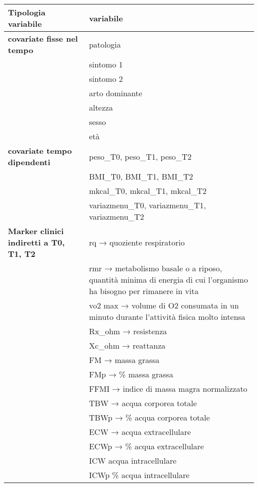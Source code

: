 \documentclass[
]{article}
\begin{document}
\begin{longtable}[]{@{}
  >{\raggedright\arraybackslash}p{}
  >{\raggedright\arraybackslash}p{}@{}}
\toprule\noalign{}
\begin{minipage}[b]{\linewidth}\raggedright
Tipologia variabile
\end{minipage} & \begin{minipage}[b]{\linewidth}\raggedright
variabile
\end{minipage} \\
\midrule\noalign{}
\endhead
\bottomrule\noalign{}
\endlastfoot
\textbf{covariate fisse nel tempo} & patologia \\
~ & sintomo 1 \\
~ & sintomo 2 \\
~ & arto dominante \\
~ & altezza \\
~ & sesso \\
~ & età \\
\textbf{covariate tempo dipendenti} & peso\_T0, peso\_T1, peso\_T2 \\
~ & BMI\_T0, BMI\_T1, BMI\_T2 \\
~ & mkcal\_T0, mkcal\_T1, mkcal\_T2 \\
~ & variazmenu\_T0, variazmenu\_T1, variazmenu\_T2 \\
\textbf{Marker clinici indiretti a T0, T1, T2} & rq → quoziente
respiratorio \\
~ & rmr → metabolismo basale o a riposo, quantità minima di energia di
cui l'organismo ha bisogno per rimanere in vita \\
~ & vo2 max → volume di O2 consumata in un minuto durante l'attività
fisica molto intensa \\
~ & Rx\_ohm → resistenza \\
~ & Xc\_ohm → reattanza \\
~ & FM → massa grassa \\
~ & FMp → \% massa grassa \\
~ & FFMI → indice di massa magra normalizzato \\
~ & TBW → acqua corporea totale \\
~ & TBWp → \% acqua corporea totale \\
~ & ECW → acqua extracellulare \\
~ & ECWp → \% acqua extracellulare \\
~ & ICW acqua intracellulare \\
~ & ICWp \% acqua intracellulare \\

\end{longtable}
\end{document}
